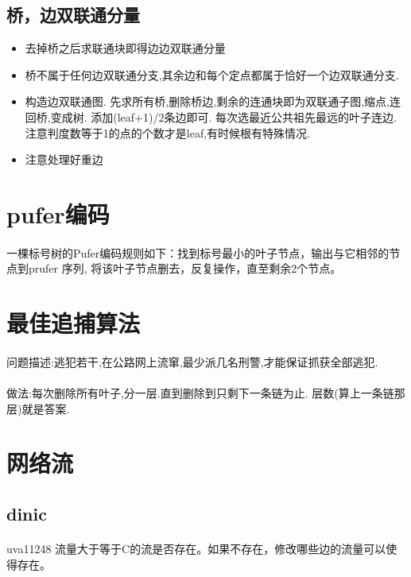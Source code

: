 \documentclass[landscape]{report}
\newcommand{\includecode}[2][c]{}
\begin{document}
\begin{flushleft}
\begin{multicols}{2}
\subsection{ 桥，边双联通分量}
\begin{itemize}
\item  去掉桥之后求联通块即得边边双联通分量
\item  桥不属于任何边双联通分支,其余边和每个定点都属于恰好一个边双联通分支.
\item 构造边双联通图. 先求所有桥,删除桥边,剩余的连通块即为双联通子图,缩点,连回桥,变成树. 添加(leaf+1)/2条边即可. 每次选最近公共祖先最远的叶子连边. 注意判度数等于1的点的个数才是leaf,有时候根有特殊情况.
\item 注意处理好重边
\end{itemize}
\includecode[c++]{poj3694.cpp}

\section{pufer编码}
\paragraph{}
 一棵标号树的Pufer编码规则如下：找到标号最小的叶子节点，输出与它相邻的节点到prufer 序列, 
将该叶子节点删去，反复操作，直至剩余2个节点。
\section{ 最佳追捕算法}
\paragraph{ }
	问题描述:逃犯若干,在公路网上流窜,最少派几名刑警,才能保证抓获全部逃犯.
\paragraph{ }
	做法:每次删除所有叶子,分一层.直到删除到只剩下一条链为止. 层数(算上一条链那层)就是答案.
\section{网络流}
\subsection{ dinic}
\paragraph{ }
uva11248 流量大于等于C的流是否存在。如果不存在，修改哪些边的流量可以使得存在。
\includecode[c++]{uva11248.cpp}

\end{multicols}
\end{flushleft}
\end{document}
